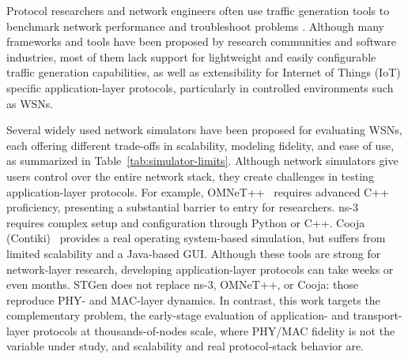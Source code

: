 \documentclass[jsan,article,submit,moreauthors,pdftex]{Definitions/mdpi}
\begin{document}



Protocol researchers and network engineers often use traffic generation tools to benchmark network performance and troubleshoot problems \cite{swann2021tools}. Although many frameworks and tools \cite{saez2023gotham, poisson2024gothx, ghazanfar2020iot, bures2021patriot,li2024iotgemini,sundresh2004sens} have been proposed by research communities and software industries, most of them lack support for lightweight and easily configurable traffic generation capabilities, as well as extensibility for Internet of Things (IoT) specific application-layer protocols, particularly in controlled environments such as WSNs. 

Several widely used network simulators have been proposed for evaluating WSNs, each offering different trade-offs in scalability, modeling fidelity, and ease of use, as summarized in Table~\ref{tab:simulator-limits}. Although network simulators give users control over the entire network stack, they create challenges in testing application-layer protocols. For example, OMNeT++~\cite{varga2008overview} requires advanced C++ proficiency, presenting a substantial barrier to entry for researchers. ns-3~\cite{riley2010ns} requires complex setup and configuration through Python or C++. Cooja (Contiki)~\cite{velinov2016running} provides a real operating system-based simulation, but suffers from limited scalability and a Java-based GUI. Although these tools are strong for network-layer research, developing application-layer protocols can take weeks or even months. STGen does not replace ns-3, OMNeT++, or Cooja: those reproduce PHY- and MAC-layer dynamics. In contrast, this work targets the complementary problem, the early-stage evaluation of application- and transport-layer protocols at thousands-of-nodes scale, where PHY/MAC fidelity is not the variable under study, and scalability and real protocol-stack behavior are.
\end{document}
